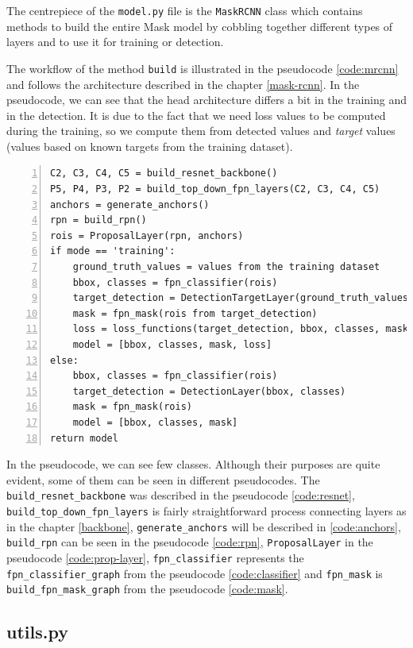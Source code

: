 The centrepiece of the \verb|model.py| file is the \verb|MaskRCNN| class which contains methods to build the entire Mask  model by cobbling together different types of layers and to use it for training or detection.

The workflow of the method \verb|build| is illustrated in the pseudocode \ref{code:mrcnn} and follows the architecture described in the chapter \ref{mask-rcnn}. In the pseudocode, we can see that the head architecture differs a bit in the training and in the detection. It is due to the fact that we need loss values to be computed during the training, so we compute them from detected values and \textit{target} values (values based on known targets from the training dataset).

{\scriptsize
\begin{lstlisting}[style=python, caption={Mask R-CNN.build}, captionpos=b, label=code:mrcnn, deletekeywords={from},
backgroundcolor = \color{light-gray}, numbers=left, breaklines=true]
C2, C3, C4, C5 = build_resnet_backbone()
P5, P4, P3, P2 = build_top_down_fpn_layers(C2, C3, C4, C5)
anchors = generate_anchors()
rpn = build_rpn()
rois = ProposalLayer(rpn, anchors)
if mode == 'training':
    ground_truth_values = values from the training dataset
    bbox, classes = fpn_classifier(rois)
    target_detection = DetectionTargetLayer(ground_truth_values)
    mask = fpn_mask(rois from target_detection)
    loss = loss_functions(target_detection, bbox, classes, mask)
    model = [bbox, classes, mask, loss]
else:
    bbox, classes = fpn_classifier(rois)
    target_detection = DetectionLayer(bbox, classes)
    mask = fpn_mask(rois)
    model = [bbox, classes, mask]
return model
\end{lstlisting}}

In the pseudocode, we can see few classes. Although their purposes are quite evident, some of them can be seen in different pseudocodes. The \verb|build_resnet_backbone| was described in the pseudocode \ref{code:resnet}, \verb|build_top_down_fpn_layers| is fairly straightforward process connecting layers as in the chapter \ref{backbone}, \verb|generate_anchors| will be described in \ref{code:anchors}, \verb|build_rpn| can be seen in the pseudocode \ref{code:rpn}, \verb|ProposalLayer| in the pseudocode \ref{code:prop-layer}, \verb|fpn_classifier| represents the \verb|fpn_classifier_graph| from the pseudocode \ref{code:classifier} and \verb|fpn_mask| is \verb|build_fpn_mask_graph| from the pseudocode \ref{code:mask}.

\subsection{utils.py}
\label{utils}

